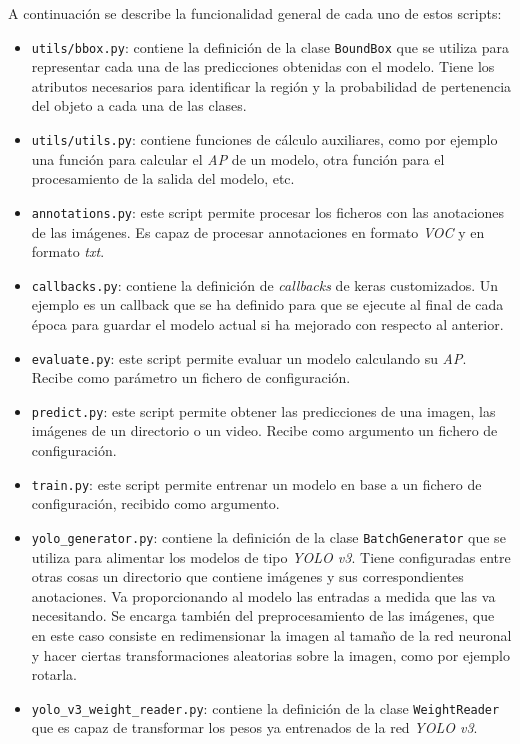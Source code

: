 A continuación se describe la funcionalidad general de cada uno de estos scripts:

\begin{itemize}
	\item \texttt{utils/bbox.py}: contiene la definición de la clase \texttt{BoundBox} que se utiliza para representar cada una de las predicciones obtenidas con el modelo. Tiene los atributos necesarios para identificar la región y la probabilidad de pertenencia del objeto a cada una de las clases.
	\item \texttt{utils/utils.py}: contiene funciones de cálculo auxiliares, como por ejemplo una función para calcular el \textit{AP} de un modelo, otra función para el procesamiento de la salida del modelo, etc.
	\item \texttt{annotations.py}: este script permite procesar los ficheros con las anotaciones de las imágenes. Es capaz de procesar annotaciones en formato \textit{VOC} y en formato \textit{txt}.
	\item \texttt{callbacks.py}: contiene la definición de \textit{callbacks} de keras customizados. Un ejemplo es un callback que se ha definido para que se ejecute al final de cada época para guardar el modelo actual si ha mejorado con respecto al anterior.
	\item \texttt{evaluate.py}: este script permite evaluar un modelo calculando su \textit{AP}. Recibe como parámetro un fichero de configuración.
	\item \texttt{predict.py}: este script permite obtener las predicciones de una imagen, las imágenes de un directorio o un video. Recibe como argumento un fichero de configuración.
	\item \texttt{train.py}: este script permite entrenar un modelo en base a un fichero de configuración, recibido como argumento.
	\item \texttt{yolo\_generator.py}: contiene la definición de la clase \texttt{BatchGenerator} que se utiliza para alimentar los modelos de tipo \textit{YOLO v3}. Tiene configuradas entre otras cosas un directorio que contiene imágenes y sus correspondientes anotaciones. Va proporcionando al modelo las entradas a medida que las va necesitando. Se encarga también del preprocesamiento de las imágenes, que en este caso consiste en redimensionar la imagen al tamaño de la red neuronal y hacer ciertas transformaciones aleatorias sobre la imagen, como por ejemplo rotarla.
	\item \texttt{yolo\_v3\_weight\_reader.py}: contiene la definición de la clase \texttt{WeightReader}  que es capaz de transformar los pesos ya entrenados de la red \textit{YOLO v3}.

\end{itemize}
